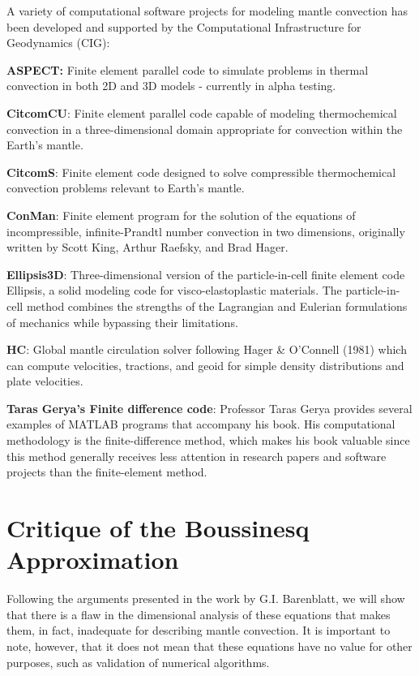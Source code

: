 A variety of computational software projects for modeling mantle convection has been developed and supported by the Computational Infrastructure for Geodynamics (CIG): \cite{cig_mantle_convection}

\textbf{ASPECT:} Finite element parallel code to simulate problems in thermal convection in both 2D and 3D models - currently in alpha testing.

\textbf{CitcomCU}: Finite element parallel code capable of modeling thermochemical convection in a three-dimensional domain appropriate for convection within the Earth's mantle. 

\textbf{CitcomS}: Finite element code designed to solve compressible thermochemical convection problems relevant to Earth's mantle.

\textbf{ConMan}: Finite element program for the solution of the equations of incompressible, infinite-Prandtl number convection in two dimensions, originally written by Scott King, Arthur Raefsky, and Brad Hager.

\textbf{Ellipsis3D}: Three-dimensional version of the particle-in-cell finite element code Ellipsis, a solid modeling code for visco-elastoplastic materials. The particle-in-cell method combines the strengths of the Lagrangian and Eulerian formulations of mechanics while bypassing their limitations.

\textbf{HC}: Global mantle circulation solver following Hager \& O'Connell (1981) which can compute velocities, tractions, and geoid for simple density distributions and plate velocities. 

\textbf{Taras Gerya's Finite difference code}: Professor Taras Gerya \cite{gerya} provides several examples of MATLAB programs that accompany his book. His computational methodology is the finite-difference method, which makes his book valuable since this method generally receives less attention in research papers and software projects than the finite-element method.

\section{Critique of the Boussinesq Approximation}

Following the arguments presented in the work \cite{barenblatt1} by G.I. Barenblatt, we will show that there is a flaw in the dimensional analysis of these equations that makes them, in fact, inadequate for describing mantle convection. It is important to note, however, that it does not mean that these equations have no value for other purposes, such as validation of numerical algorithms.

